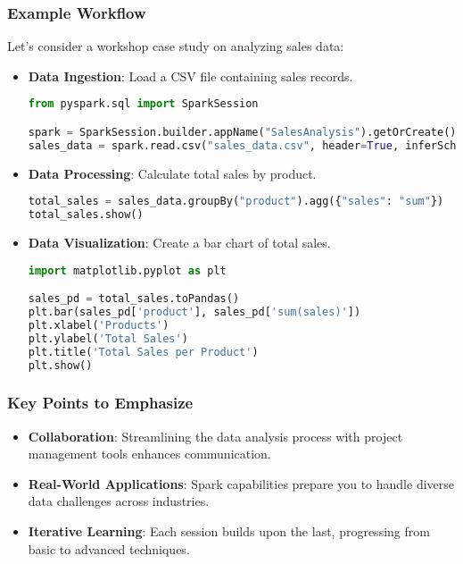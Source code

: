 \documentclass[aspectratio=169]{beamer}
\begin{document}
\begin{frame}[fragile]
    \frametitle{Example Workflow}
    Let's consider a workshop case study on analyzing sales data:
    \begin{itemize}
        \item \textbf{Data Ingestion}: Load a CSV file containing sales records.
        \begin{lstlisting}[language=Python]
from pyspark.sql import SparkSession

spark = SparkSession.builder.appName("SalesAnalysis").getOrCreate()
sales_data = spark.read.csv("sales_data.csv", header=True, inferSchema=True)
        \end{lstlisting}

        \item \textbf{Data Processing}: Calculate total sales by product.
        \begin{lstlisting}[language=Python]
total_sales = sales_data.groupBy("product").agg({"sales": "sum"})
total_sales.show()
        \end{lstlisting}

        \item \textbf{Data Visualization}: Create a bar chart of total sales.
        \begin{lstlisting}[language=Python]
import matplotlib.pyplot as plt

sales_pd = total_sales.toPandas()
plt.bar(sales_pd['product'], sales_pd['sum(sales)'])
plt.xlabel('Products')
plt.ylabel('Total Sales')
plt.title('Total Sales per Product')
plt.show()
        \end{lstlisting}
    \end{itemize}
\end{frame}

\begin{frame}[fragile]
    \frametitle{Key Points to Emphasize}
    \begin{itemize}
        \item \textbf{Collaboration}: Streamlining the data analysis process with project management tools enhances communication.
        \item \textbf{Real-World Applications}: Spark capabilities prepare you to handle diverse data challenges across industries.
        \item \textbf{Iterative Learning}: Each session builds upon the last, progressing from basic to advanced techniques.
    \end{itemize}
\end{frame}
\end{document}
